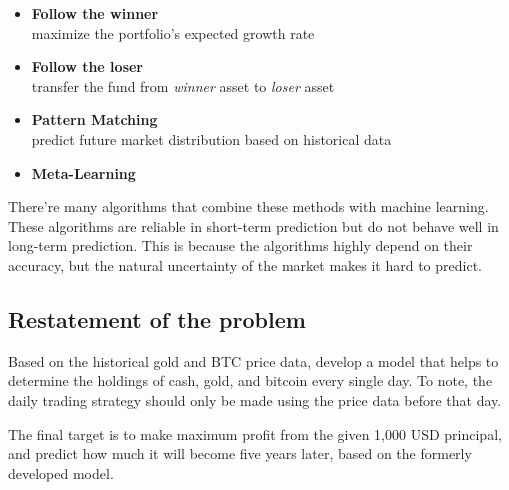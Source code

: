\documentclass{mcmthesis}
\begin{document}
\begin{itemize}
  \item \textbf{Follow the winner}\\
  maximize the portfolio's expected growth rate
  \item \textbf{Follow the loser}\\
  transfer the fund from \textit{winner} asset to \textit{loser} asset
  \item \textbf{Pattern Matching}\\
  predict future market distribution based on historical data
  \item \textbf{Meta-Learning}
\end{itemize}

There're many algorithms that combine these methods with machine learning.
These algorithms are reliable in short-term prediction
but do not behave well in long-term prediction.
This is because the algorithms highly depend on their accuracy,
but the natural uncertainty of the market makes it hard to predict.

\subsection{Restatement of the problem}

Based on the historical gold and BTC price data,
develop a model that helps to determine the holdings of cash, gold, and bitcoin every single day.
To note, the daily trading strategy should only be made using the price data before that day.

The final target is to make maximum profit from the given 1,000 USD principal,
and predict how much it will become five years later, based on the formerly developed model.


\end{document}
